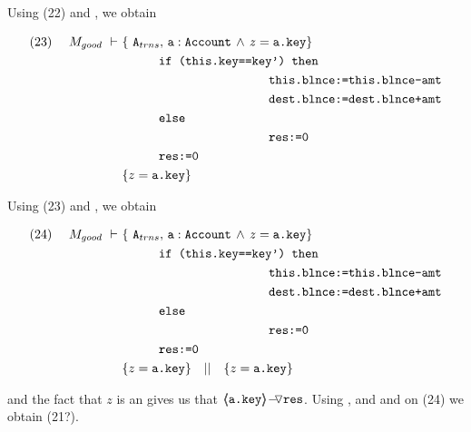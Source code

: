 \begin{proofO}
Using (22) and {\sc{[Prot-1]}},  we obtain

\small
\begin{align*}
\text{(23)}  \ \ \ \ M_{good}\ \vdash  \ 
		&	\{  \ \Alocalstr, \, \prg{a}:\prg{Account}\, \wedge\,  z=\prg{a.key} \} \\
		&   \SPT   \prg{if (this.key==key') then }\\
		& \SPT \SPT   \SPT\SPT  \prg{this.\balance:=this.\balance-amt} \\
	        & \SPT \SPT   \SPT\SPT  \prg{dest.\balance:=dest.\balance+amt} \\
		& \SPT   \prg{else }\\
		& \SPT\SPT   \SPT\SPT  \prg{res:=0} \\
		& \SPT \prg{res:=0} \\
		& \{  z=\prg{a.key} \} \ \ \ 
\end{align*}
\normalsize


Using (23) and   {\sc{[Embed-UL]}}, we obtain 

\small
\begin{align*}
\text{(24)}  \ \ \ \ M_{good}\ \vdash \ 
		&	\{  \ \Alocalstr, \, \prg{a}:\prg{Account}\, \wedge\,  z=\prg{a.key} \} \\
		&  \SPT   \prg{if (this.key==key') then }\\
		& \SPT \SPT   \SPT\SPT  \prg{this.\balance:=this.\balance-amt} \\
	        & \SPT \SPT   \SPT\SPT  \prg{dest.\balance:=dest.\balance+amt} \\
		& \SPT   \prg{else }\\
		& \SPT\SPT   \SPT\SPT  \prg{res:=0} \\
		& \SPT \prg{res:=0} \\
		& \{  z=\prg{a.key} \}  \ \ \  || \ \ \  \{  z=\prg{a.key} \} 
\end{align*}
\normalsize

 {} and the fact that $z$ is an   gives us that ${\PushASLong {\prg{res}} {\inside{\prg{a.key}}}}$.
Using  {\sc{[Types]}},  and  {} and   {\sc{[Consequ]}}   on (24) we obtain (21?).



\end{proofO}

\label{s:set:sat}
 


